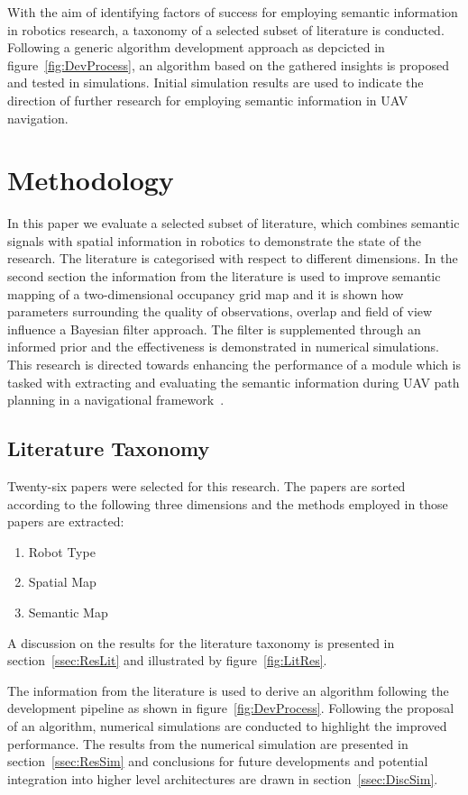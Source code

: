 \documentclass[twocolumn,letterpaper]{IEEEAerospaceCLS}  %
\begin{document}
With the aim of identifying factors of success for employing semantic information in robotics research, a taxonomy of a selected subset of literature is conducted. Following a generic algorithm development approach as depcicted in figure~\ref{fig:DevProcess}, an algorithm based on the gathered insights is proposed and tested in simulations. Initial simulation results are used to indicate the direction of further research for employing semantic information in UAV navigation.
\section{Methodology} \label{sec:Met}
In this paper we evaluate a selected subset of literature, which combines semantic signals with spatial information in robotics to demonstrate the state of the research. The literature is categorised with respect to different dimensions. In the second section the information from the literature is used to improve semantic mapping of a two-dimensional occupancy grid map and it is shown how parameters surrounding the quality of observations, overlap and field of view influence a Bayesian filter approach. The filter is supplemented through an informed prior and the effectiveness is demonstrated in numerical simulations. This research is directed towards enhancing the performance of a module which is tasked with extracting and evaluating the semantic information during UAV path planning in a navigational framework~\cite{mandel_towards_2020}.
\subsection{Literature Taxonomy} \label{ssec:MetLit}
Twenty-six papers were selected for this research. The papers are sorted according to the following three dimensions and the methods employed in those papers are extracted:
\begin{enumerate}
    \item Robot Type
    \item Spatial Map
    \item Semantic Map
\end{enumerate}
A discussion on the results for the literature taxonomy is presented in section~\ref{ssec:ResLit} and illustrated by figure~\ref{fig:LitRes}.

The information from the literature is used to derive an algorithm following the development pipeline as shown in figure~\ref{fig:DevProcess}. Following the proposal of an algorithm, numerical simulations are conducted to highlight the improved performance. The results from the numerical simulation are presented in section~\ref{ssec:ResSim} and conclusions for future developments and potential integration into higher level architectures are drawn in section~\ref{ssec:DiscSim}.
\end{document}

